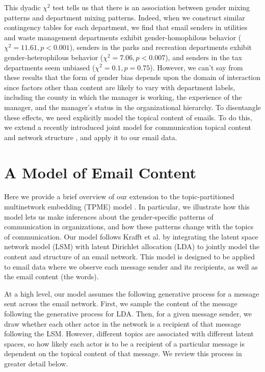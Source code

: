 \documentclass{pnastwo}
\begin{document}
\begin{article}
	
This dyadic $\chi^2$ test tells us that there is an association between gender mixing patterns and department mixing patterns. Indeed, when we construct similar contingency tables for each department, we find that email senders in utilities and waste management departments exhibit gender-homophilous behavior ($\chi^2 = 11.61, p < 0.001$), senders in the parks and recreation departments exhibit gender-heterophilous behavior ($\chi^2 = 7.06, p < 0.007$), and senders in the tax departments seem unbiased ($\chi^2 = 0.1, p = 0.75$). However, we can't say from these results that the form of gender bias depends upon the domain of interaction since factors other than content are likely to vary with department labels, including the county in which the manager is working, the experience of the manager, and the manager's status in the organizational hierarchy. To disentangle these effects, we need explicitly model the topical content of emails. To do this, we extend a recently introduced joint model for communication topical content and network structure \citep{Krafft2012}, and apply it to our email data.
	


\section{A Model of Email Content}
Here we provide a brief overview of our extension to the topic-partitioned
multinetwork embedding (TPME) model \citep{Krafft2012}. In particular, we illustrate how this model lets us make inferences about the gender-specific patterns of communication in organizations, and how these patterns change with the topics of communication. Our model follows Krafft et al. \citep{Krafft2012} by integrating the latent space network model (LSM) \citep{Hoff2002a} with latent Dirichlet allocation (LDA) \cite{Blei2003} to jointly model the content and structure of an email network. This model is designed to be applied to email data where we observe each message sender and its recipients, as well as the email content (the words). 

At a high level, our model assumes the following generative process for a message sent across the email network. First, we sample the content of the message following the generative process for LDA. Then, for a given message sender, we draw whether each other actor in the network is a recipient of that message following the LSM. However, different topics are associated with different latent spaces, so how likely each actor is to be a recipient of a particular message is dependent on the topical content of that message. We review this process in greater detail below.  


\end{article}
\end{document}
